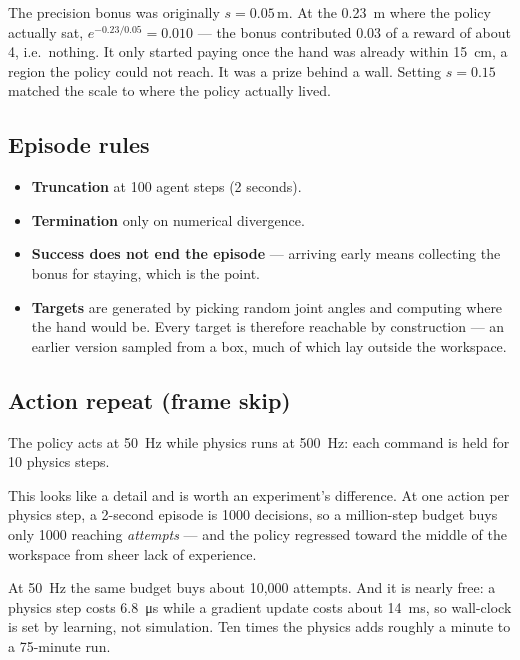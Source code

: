 \begin{trap}
The precision bonus was originally $s = 0.05$\,m. At the \SI{0.23}{\meter} where
the policy actually sat, $e^{-0.23/0.05} = 0.010$ --- the bonus contributed
$0.03$ of a reward of about 4, i.e.\ nothing. It only started paying once the hand
was already within \SI{15}{\centi\meter}, a region the policy could not reach. It
was a prize behind a wall. Setting $s = 0.15$ matched the scale to where the
policy actually lived.
\end{trap}

\subsection{Episode rules}

\begin{itemize}[leftmargin=1.4em, itemsep=2pt]
\item \textbf{Truncation} at 100 agent steps (2 seconds).
\item \textbf{Termination} only on numerical divergence.
\item \textbf{Success does not end the episode} --- arriving early means
collecting the bonus for staying, which is the point.
\item \textbf{Targets} are generated by picking random joint angles and computing
where the hand would be. Every target is therefore reachable by construction ---
an earlier version sampled from a box, much of which lay outside the workspace.
\end{itemize}

\subsection{Action repeat (frame skip)}

The policy acts at \SI{50}{\hertz} while physics runs at \SI{500}{\hertz}: each
command is held for 10 physics steps.

\begin{why}
This looks like a detail and is worth an experiment's difference. At one action
per physics step, a 2-second episode is 1000 decisions, so a million-step budget
buys only 1000 reaching \emph{attempts} --- and the policy regressed toward the
middle of the workspace from sheer lack of experience.

At \SI{50}{\hertz} the same budget buys about 10{,}000 attempts. And it is nearly
free: a physics step costs \SI{6.8}{\micro\second} while a gradient update costs
about \SI{14}{\milli\second}, so wall-clock is set by learning, not simulation.
Ten times the physics adds roughly a minute to a 75-minute run.
\end{why}

